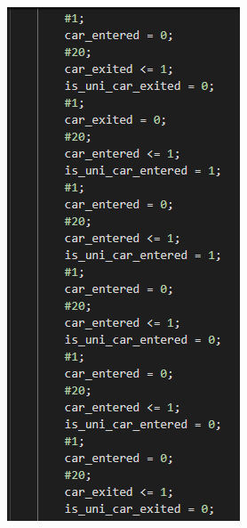 \documentclass{article}
\begin{document}
\begin{enumerate}[label=\textbf{\alph*)}]
\begin{figure}[H]
\begin{minipage}{0.45\textwidth}
    \end{minipage}\hfill
    \begin{minipage}{0.45\textwidth}
        \centering
        \includegraphics[width=\textwidth]{Test2.png}
    \end{minipage}
\end{figure}


\end{enumerate}
\end{document}
